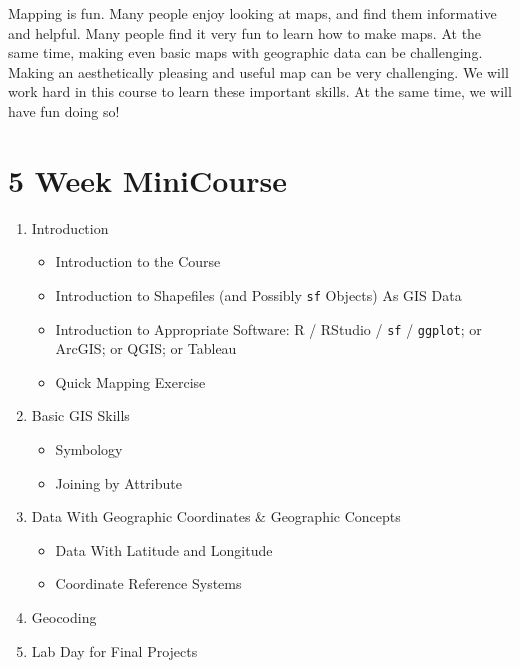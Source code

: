 \documentclass[
  letterpaper,
  DIV=11,
  numbers=noendperiod,
  oneside]{scrreprt}
\providecommand{\tightlist}{%
  \setlength{\itemsep}{0pt}\setlength{\parskip}{0pt}}\usepackage{longtable,booktabs,array}
\begin{document}
\begin{tcolorbox}[enhanced jigsaw, coltitle=black, breakable, leftrule=.75mm, opacityback=0, colback=white, bottomtitle=1mm, left=2mm, toptitle=1mm, toprule=.15mm, opacitybacktitle=0.6, rightrule=.15mm, titlerule=0mm, colframe=quarto-callout-important-color-frame, bottomrule=.15mm, title=\textcolor{quarto-callout-important-color}{\faExclamation}\hspace{0.5em}{Mapping is FUN \textbf{and} CHALLENGING}, colbacktitle=quarto-callout-important-color!10!white, arc=.35mm]

Mapping is fun. Many people enjoy looking at maps, and find them
informative and helpful. Many people find it very fun to learn how to
make maps. At the same time, making even basic maps with geographic data
can be challenging. Making an aesthetically pleasing and useful map can
be very challenging. We will work hard in this course to learn these
important skills. At the same time, we will have fun doing so!

\end{tcolorbox}

\section{5 Week MiniCourse}\label{sec-fiveweek}

\begin{enumerate}
\def\labelenumi{\arabic{enumi}.}
\tightlist
\item
  Introduction

  \begin{itemize}
  \tightlist
  \item
    Introduction to the Course
  \item
    Introduction to Shapefiles (and Possibly \texttt{sf} Objects) As GIS
    Data
  \item
    Introduction to Appropriate Software: R / RStudio / \texttt{sf} /
    \texttt{ggplot}; or ArcGIS; or QGIS; or Tableau
  \item
    Quick Mapping Exercise
  \end{itemize}
\item
  Basic GIS Skills

  \begin{itemize}
  \tightlist
  \item
    Symbology
  \item
    Joining by Attribute
  \end{itemize}
\item
  Data With Geographic Coordinates \& Geographic Concepts

  \begin{itemize}
  \tightlist
  \item
    Data With Latitude and Longitude
  \item
    Coordinate Reference Systems
  \end{itemize}
\item
  Geocoding
\item
  Lab Day for Final Projects
\end{enumerate}
\end{document}
